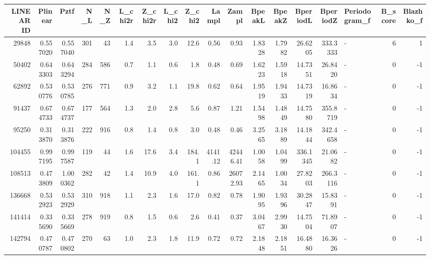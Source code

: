 \begin{tabular}{rrrrrrrrrrrrrrrlrr}
\toprule
 LINEAR ID &  Plinear &       Pztf &  N\_L &  N\_Z &  L\_chi2r &  Z\_chi2r &  L\_chi2 &   Z\_chi2 &      Lampl &       Zampl &  BpeakL &  BpeakZ &  BperiodL &  BperiodZ & Periodogram\_f &  B\_score &  Blazhko\_f \\
\midrule
     29848 & 0.557020 &   0.557040 &  301 &   43 &      1.4 &      3.5 &     3.0 &     12.6 &       0.56 &        0.93 &  1.8328 &  1.7982 &   26.6205 &  333.3333 &             - &        6 &          1 \\
     50402 & 0.643303 &   0.643294 &  284 &  586 &      0.7 &      1.1 &     0.6 &      1.8 &       0.48 &        0.69 &  1.6223 &  1.5918 &   14.7351 &   26.8420 &             - &        0 &         -1 \\
     62892 & 0.530776 &   0.530785 &  276 &  771 &      0.9 &      3.2 &     1.1 &     19.8 &       0.62 &        0.64 &  1.9519 &  1.9433 &   14.7319 &   16.8634 &             - &        0 &         -1 \\
     91437 & 0.674733 &   0.674737 &  177 &  564 &      1.3 &      2.0 &     2.8 &      5.6 &       0.87 &        1.21 &  1.5498 &  1.4849 &   14.7580 &  355.8719 &             - &        0 &         -1 \\
     95250 & 0.313870 &   0.313876 &  222 &  916 &      0.8 &      1.4 &     0.8 &      3.0 &       0.48 &        0.46 &  3.2565 &  3.1889 &   14.1844 &  342.4658 &             - &        0 &         -1 \\
    104455 & 0.997195 &   0.997587 &  119 &   44 &      1.6 &     17.6 &     3.4 &    184.1 &    4141.12 &    42446.41 &  1.0058 &  1.0499 &  336.1345 &   21.0682 &             - &        0 &         -1 \\
    108513 & 0.473809 &   1.000362 &  282 &   42 &      1.4 &     10.9 &     4.0 &    161.1 &       0.86 &    26072.93 &  2.1465 &  1.0034 &   27.8203 &  266.3116 &             - &        0 &         -1 \\
    136668 & 0.532923 &   0.532929 &  310 &  918 &      1.1 &      2.3 &     1.6 &     17.0 &       0.82 &        0.78 &  1.9095 &  1.9396 &   30.2847 &   15.8391 &             - &        0 &         -1 \\
    141414 & 0.335690 &   0.335669 &  278 &  919 &      0.8 &      1.5 &     0.6 &      2.6 &       0.41 &        0.37 &  3.0467 &  2.9930 &   14.7504 &   71.8907 &             - &        0 &         -1 \\
    142794 & 0.470787 &   0.470802 &  270 &   63 &      1.0 &      2.3 &     1.8 &     11.9 &       0.72 &        0.72 &  2.1848 &  2.1851 &   16.4880 &   16.3626 &             - &        0 &         -1 \\

\end{tabular}

